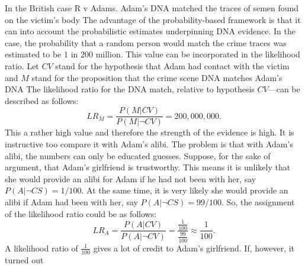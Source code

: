 \documentclass[10pt]{article}
\begin{document}
In the British case R v Adams. 
Adam's DNA matched the traces of semen found on the victim's body
The advantage of the probability-based framework is that it can 
into account the probabilistic estimates underpinning DNA evidence. In the case, 
the probability that a random person would match the crime 
traces was estimated to be 1 in 200 million. This value can 
be incorporated in the likelihood ratio. Let $CV$ stand for the hypothesis that Adam had 
contact with the victim and $M$ stand for the 
proposition that the crime scene DNA matches Adam's DNA
The likelihood ratio for the DNA match, relative to hypothesis $CV$---can be described as follows:
%
\[LR_M=\frac{P(M| CV)}{P(M| \neg CV)}=200,000,000.\]
%
This a rather high value and therefore the strength of the evidence is high.
It is instructive too compare it with Adam's alibi. 
The problem is that with Adam's alibi, the numbers can only be educated 
guesses. Suppose, for the sake of argument, that Adam's girlfriend is trustworthy.
This means it is unlikely that she would provide an alibi for 
Adam if he had not been with her, say $P(A| \neg CS)=1/100$.
At the same time, it is very likely she would provide an alibi if Adam had been with her, say
$P(A| \neg CS)=99/100$. So, the assignment of the 
likelihood ratio could be
as follows:
%
\[LR_A=\frac{P(A| CV)}{P(A| \neg CV)}=\frac{\frac{1}{100}}{\frac{99}{100}} \approx \frac{1}{100}.\]
%
A likelihood ratio of $\frac{1}{100}$ gives a lot of credit to Adam's girlfriend. If, however, it turned out 
\end{document}
